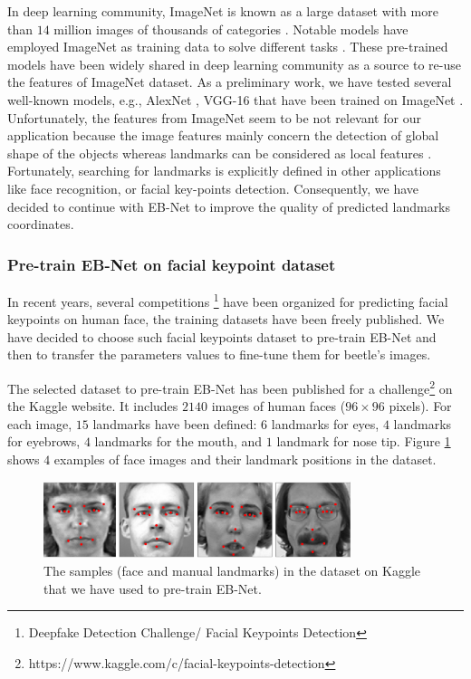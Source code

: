 \documentclass[review]{elsarticle}
\begin{document}
In deep learning community, ImageNet is known as a large dataset with more than $14$ million images of thousands of categories \cite{deng2009imagenet}. Notable models have employed ImageNet as training data to solve different tasks \cite{krizhevsky2012imagenet, simonyan2014very}. These pre-trained models have been widely shared in deep learning community as a source to re-use the features of ImageNet dataset. As a preliminary work, we have tested several well-known models, e.g., AlexNet \cite{krizhevsky2012imagenet}, VGG-16 \cite{simonyan2014very} that have been trained on ImageNet \cite{deng2009imagenet}. Unfortunately, the features from ImageNet seem to be not relevant for our application because the image features mainly concern the detection of global shape of the objects whereas landmarks can be considered as local features \cite{lin2016homemade}. Fortunately, searching for landmarks is explicitly defined in other applications like face recognition, or facial key-points detection. Consequently, we have decided to continue with EB-Net to improve the quality of predicted landmarks coordinates.

\subsubsection{Pre-train EB-Net on facial keypoint dataset}
In recent years, several competitions \footnote{Deepfake Detection Challenge/ Facial Keypoints Detection} have been organized for predicting facial keypoints on human face, the training datasets have been freely published. We have decided to choose such facial keypoints dataset to pre-train EB-Net and then to transfer the parameters values to fine-tune them for beetle's images.

The selected dataset to pre-train EB-Net has been published for a challenge\footnote{https://www.kaggle.com/c/facial-keypoints-detection} on the Kaggle website. It includes $2140$ images of human faces ($96 \times 96$ pixels). For each image, $15$ landmarks have been defined: $6$ landmarks for eyes, $4$ landmarks for eyebrows, $4$ landmarks for the mouth, and $1$ landmark for nose tip. Figure \ref{fighmface} shows $4$ examples of face images and their landmark positions in the dataset.

\begin{figure}[h!]
	\centering
	\includegraphics[width=0.80\textwidth]{images/face_dataset_2}
	\caption{The samples (face and manual landmarks) in the dataset on Kaggle that we have used to pre-train EB-Net.}
	\label{fighmface}
\end{figure}
\end{document}
